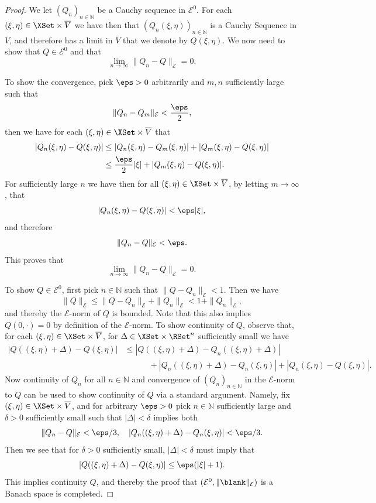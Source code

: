 \documentclass[a4paper]{siamart190516}
\begin{document}
\begin{proof} 
We let $(Q_n)_{n \in \mathbb{N}}$ be a Cauchy sequence in $\mathcal{E}^{0}$. For each $(\xi,\eta) \in \XSet \times \overline{V}$ we have then that  $(Q_n(\xi,\eta))_{n \in \mathbb{N}}$ is a Cauchy Sequence in $\overline{V}$, and therefore has a limit in $\overline{V}$ that we denote by $Q(\xi,\eta)$. We now need to show that $Q \in \mathcal{E}^{0}$ and that
\[
\lim_{n \rightarrow \infty} \|Q_n - Q \|_{\mathcal{E}} = 0.
\]

To show the convergence, pick $\eps > 0$ arbitrarily and $m, n$ sufficiently large such that
\[
 \|Q_n - Q_m \|_{\mathcal{E}} < \frac{\eps}{2},
\]
then we have for each $(\xi,\eta) \in \XSet \times \overline{V}$ that
\begin{align*}
|Q_n(\xi,\eta) - Q(\xi,\eta) | &\leq |Q_n(\xi,\eta) - Q_m(\xi,\eta) | + |Q_m(\xi,\eta) - Q(\xi,\eta) | \\
&\leq \frac{\eps}{2} |\xi| +  |Q_m(\xi,\eta) - Q(\xi,\eta) |.
\end{align*}
For sufficiently large $n$ we have then for all $(\xi,\eta) \in \XSet \times \overline{V}$, by letting $m \rightarrow \infty$, that
\[
|Q_n(\xi,\eta) - Q(\xi,\eta) | < \eps |\xi|,
\]
and therefore
\[
\|Q_n - Q \|_{\mathcal{E}} < \eps.
\]
This proves that 
\[
\lim_{n \rightarrow \infty} \| Q_n - Q \|_{\mathcal{E}} = 0.
\]

To show  $Q \in \mathcal{E}^{0}$, first pick $n \in \mathbb{N}$ such that $\|Q - Q_n \|_{\mathcal{E}} < 1$. Then we have
\[
\| Q \|_{\mathcal{E}} \leq \| Q-Q_n \|_{\mathcal{E}} + \|Q_n\|_{\mathcal{E}} < 1 + \|Q_n\|_{\mathcal{E}},
\]
and thereby the $\mathcal{E}$-norm of $Q$ is bounded. Note that this also implies $Q(0, \cdot) = 0$ by definition of the $\mathcal{E}$-norm. To show continuity of $Q$, observe that, for each $(\xi,\eta) \in \XSet \times \overline{V}$, for $\Delta \in \XSet \times \RSet^n$ sufficiently small we have
\begin{align*}
| Q((\xi,\eta)+ \Delta) - Q(\xi,\eta) | &\leq | Q((\xi,\eta)+ \Delta) - Q_n((\xi,\eta)+\Delta) | \\
&\qquad \quad +  | Q_n((\xi,\eta)+ \Delta) - Q_n(\xi,\eta) | +  | Q_n(\xi,\eta)  - Q(\xi,\eta)|.
\end{align*}
Now continuity of $Q_n$ for all $n \in \mathbb{N}$ and convergence of $(Q_n)_{n \in \mathbb{N}}$ in the  $\mathcal{E}$-norm to $Q$ can be used to show continuity of $Q$ via a standard argument. Namely, fix $(\xi,\eta)  \in \XSet \times \overline{V}$, and for arbitrary $\eps > 0$ pick $n \in \mathbb{N}$ sufficiently large and  $\delta > 0$ sufficiently small such that $|\Delta| < \delta$ implies  both
\[
\|Q_n - Q\|_{\mathcal{E}}  < \eps / 3, \quad | Q_n((\xi,\eta)+ \Delta) - Q_n(\xi,\eta) | < \eps / 3.
\]
Then we see that for $\delta > 0$ sufficiently small, $|\Delta| < \delta$ must imply that
\[
| Q((\xi,\eta)+ \Delta) - Q(\xi,\eta) | \leq \eps( |\xi| + 1 ).
\]
This implies continuity $Q$, and thereby the proof that $(\mathcal{E}^0, \| \blank \|_{\mathcal{E}})$ is a Banach space is completed.
\end{proof}
\end{document}
